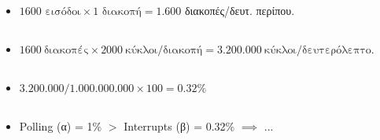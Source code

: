\documentclass{article}
\begin{document}
\subsection*{}

\begin{itemize}
    \item {} $1600\text{ εισόδοι} \times 1\text{ διακοπή} = 1.600$ διακοπές/δευτ. περίπου.
\end{itemize}

\subsection*{}

\begin{itemize}
    \item {} $1600~\text{διακοπές} \times 2000~\text{κύκλοι/διακοπή} = 3.200.000~\text{κύκλοι/δευτερόλεπτο}$.
\end{itemize}

\subsection*{}

\begin{itemize}
    \item {} ${3.200.000} / {1.000.000.000} \times 100 = 0.32\%$
\end{itemize}

\subsection*{}

\begin{itemize}
    \item \textlatin{Polling} (α) = {1\%} $>$
    \textlatin{Interrupts} (β) = {0.32\%} $\implies$  ...
\end{itemize}

\newpage
\text{   }
\vspace{-2.205cm}

\subsection*{}
\end{document}
